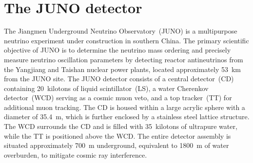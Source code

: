 
\chapter{The JUNO detector}
The Jiangmen Underground Neutrino Observatory~(JUNO) is a multipurpose neutrino experiment under construction in southern China. The primary scientific objective of JUNO is to determine the neutrino mass ordering and precisely measure neutrino oscillation parameters by detecting reactor antineutrinos from the Yangjiang and Taishan nuclear power plants, located approximately \SI{53}{km} from the JUNO site. The JUNO detector consists of a central detector~(CD) containing \SI{20}{kilotons} of liquid scintillator~(LS), a water Cherenkov detector~(WCD) serving as a cosmic muon veto, and a top tracker~(TT) for additional muon tracking. The CD is housed within a large acrylic sphere with a diameter of \SI{35.4}{m}, which is further enclosed by a stainless steel lattice structure. The WCD surrounds the CD and is filled with \SI{35}{kilotons} of ultrapure water, while the TT is positioned above the WCD. The entire detector assembly is situated approximately \SI{700}{m} underground, equivalent to \SI{1800}{m} of water overburden, to mitigate cosmic ray interference.

